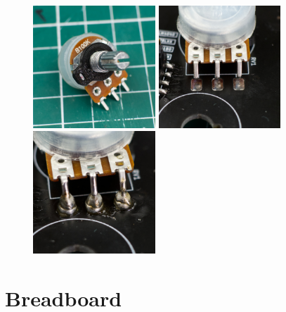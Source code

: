 \documentclass[12pt, a4paper]{article}
\begin{document}
\begin{figure}[H]
    \centering
    \includegraphics[width=46mm]{images/section_3-4_washer.jpg}
    \hspace{2mm}
    \includegraphics[width=46mm]{images/section_3-4_screwed.jpg}
    \hspace{2mm}
    \includegraphics[width=46mm]{images/section_3-4_solder_stack.jpg}
\end{figure}

\pagebreak
\section{Breadboard}
\end{document}

